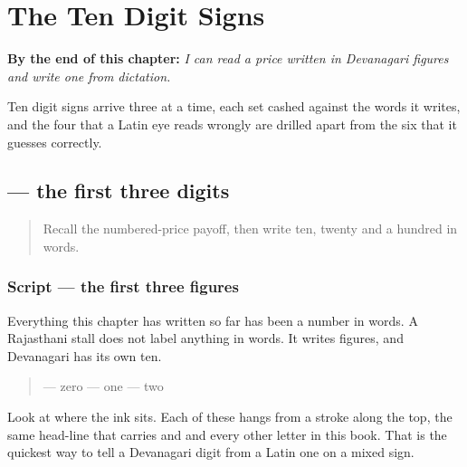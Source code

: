 
\chapter{The Ten Digit Signs}
\label{ch:mw-digits}

\begin{chapteropening}
\textbf{By the end of this chapter:} \emph{I can read a price written in Devanagari figures and write one from dictation.}

Ten digit signs arrive three at a time, each set cashed against the words it writes, and the four that a Latin eye reads wrongly are drilled apart from the six that it guesses correctly.
\end{chapteropening}

\section[\texorpdfstring{\mw{०} \mw{१} \mw{२} (0 1 2)}{० १ २ (0 1 2)}]{   — the first three digits}

\label{lesson:MW-W35-digits-zero-one-two}



\begin{quote}
Recall the numbered-price payoff, then write ten, twenty and a hundred in words.
\end{quote}

\subsection*{Script — the first three figures}
Everything this chapter has written so far has been a number in words. A Rajasthani stall does not label anything in words. It writes figures, and Devanagari has its own ten.

\begin{quote}
\textbf{} — zero  \textbf{} — one  \textbf{} — two
\end{quote}

Look at where the ink sits. Each of these hangs from a stroke along the top, the same head-line that carries \textbf{} and \textbf{} and every other letter in this book. That is the quickest way to tell a Devanagari digit from a Latin one on a mixed sign.

